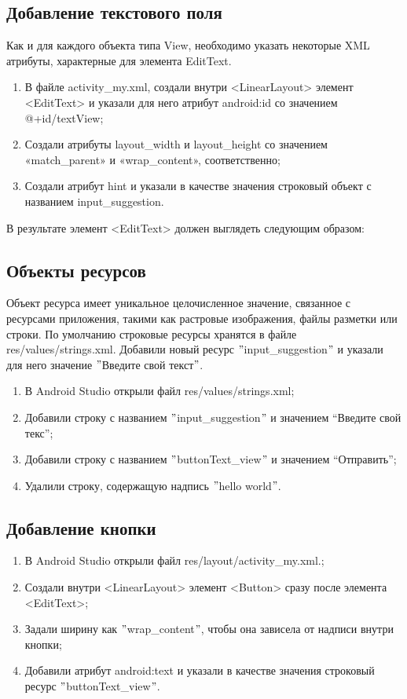 
\subsection{Добавление текстового поля}
Как и для каждого объекта типа View, необходимо указать некоторые XML атрибуты, характерные для элемента EditText.
\begin{enumerate}
	\item В файле activity\_my.xml, создали внутри <LinearLayout> элемент <EditText> и указали для него атрибут android:id со значением @+id/textView;
	\item Создали атрибуты layout\_width и layout\_height со значением «match\_parent» и «wrap\_content», соответственно;
	\item Создали атрибут hint и указали в качестве значения строковый объект с названием input\_suggestion.
\end{enumerate}
В результате элемент <EditText> должен выглядеть следующим образом:


\subsection{Объекты ресурсов}
Объект ресурса имеет уникальное целочисленное значение, связанное с ресурсами приложения, такими как растровые
изображения, файлы разметки или строки.
По умолчанию строковые ресурсы хранятся в файле res/values/strings.xml.
Добавили новый ресурс \("\)input\_suggestion\("\) и указали для него значение \("\)Введите свой текст\("\).
\begin{enumerate}
	\item В Android Studio открыли файл res/values/strings.xml;
	\item Добавили строку с названием \("\)input\_suggestion\("\) и значением “Введите свой текс”;
	\item Добавили строку с названием \("\)buttonText\_view\("\) и значением “Отправить”;
	\item Удалили строку, содержащую надпись \("\)hello world\("\).
\end{enumerate}

\subsection{Добавление кнопки}
\begin{enumerate}
	\item В Android Studio открыли файл res/layout/activity\_my.xml.;
	\item Создали внутри <LinearLayout> элемент <Button> сразу после элемента <EditText>;
	\item Задали ширину как \("\)wrap\_content\("\), чтобы она зависела от надписи внутри кнопки;
	\item Добавили атрибут android:text и указали в качестве значения строковый ресурс \("\)buttonText\_view\("\).
\end{enumerate}

